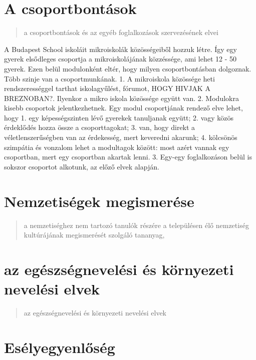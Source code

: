 \section{A csoportbontások}\label{a-csoportbontuxe1sok}

\begin{quote}
a csoportbontások és az egyéb foglalkozások szervezésének elvei
\end{quote}

A Budapest School iskoláit mikroiskolák közösségeiből hozzuk létre. Így
egy gyerek elsődleges csoportja a mikroiskolájának közzéssége, ami lehet
12 - 50 gyerek. Ezen belül modulonként eltér, hogy milyen
csoportbontásban dolgoznak. Több szinje van a csoportmunkának. 1. A
mikroiskola közössége heti rendszerességgel tarthat iskolagyűlést,
fórumot, HOGY HIVJAK A BREZNOBAN?. Ilyenkor a mikro iskola közössége
együtt van. 2. Modulokra kisebb csoportok jelentkezhetnek. Egy modul
csoportjának rendező elve lehet, hogy 1. egy képességszinten lévő
gyerekek tanuljanak együtt; 2. vagy közös érdeklődés hozza össze a
csoporttagokat; 3. van, hogy direkt a véletlenszerűségben van az
érdekesség, mert keveredni akarunk; 4. kölcsönös szimpátia és vonzalom
lehet a modultagok között: most azért vannak egy csoportban, mert egy
csoportban akartak lenni. 3. Egy-egy foglalkozáson belül is sokszor
csoportot alkotunk, az előző elvek alapján.

\section{Nemzetiségek
megismerése}\label{nemzetisuxe9gek-megismeruxe9se}

\begin{quote}
a nemzetiséghez nem tartozó tanulók részére a településen élő nemzetiség
kultúrájának megismerését szolgáló tananyag,
\end{quote}

\section{az egészségnevelési és környezeti nevelési
elvek}\label{az-eguxe9szsuxe9gneveluxe9si-uxe9s-kuxf6rnyezeti-neveluxe9si-elvek}

\begin{quote}
az egészségnevelési és környezeti nevelési elvek
\end{quote}

\section{Esélyegyenlőség}\label{esuxe9lyegyenlux151suxe9g}

